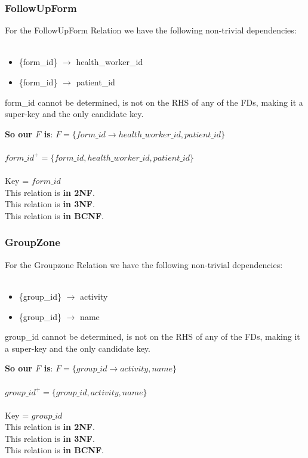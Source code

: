 \documentclass{article}
\begin{document}
\subsubsection{FollowUpForm}
For the FollowUpForm Relation we have the following non-trivial dependencies:\\
\\
\begin{minipage}{\textwidth}
\begin{itemize}
    \item  \{form\_id\}   $\rightarrow$ health\_worker\_id
    \item  \{form\_id\}   $\rightarrow$ patient\_id
\end{itemize}
\end{minipage}
form\_id cannot be determined, is not on the RHS of any of the FDs, making it a super-key and the only candidate key.
\begin{tcolorbox}
    \textbf{So our $F$ is}:
$F = \{form\_id \rightarrow health\_worker\_id, patient\_id\}$\\
\\
$form\_id^+ = \{form\_id, health\_worker\_id, patient\_id\}$\\
\\
Key = $form\_id$\\
This relation is \textbf{in 2NF}.\\
This relation is \textbf{in 3NF}.\\
This relation is \textbf{in BCNF}.
\end{tcolorbox}
\newpage
\subsubsection{GroupZone}
For the Groupzone Relation we have the following non-trivial dependencies:\\
\\
\begin{minipage}{\textwidth}
\begin{itemize}
    \item  \{group\_id\}   $\rightarrow$ activity
    \item  \{group\_id\}   $\rightarrow$ name
\end{itemize}
\end{minipage}
group\_id cannot be determined, is not on the RHS of any of the FDs, making it a super-key and the only candidate key.
\begin{tcolorbox}
    \textbf{So our $F$ is}:
$F = \{group\_id \rightarrow activity, name \}$\\
\\
$group\_id^+ = \{group\_id, activity, name\}$\\
\\
Key = $group\_id$\\
This relation is \textbf{in 2NF}.\\
This relation is \textbf{in 3NF}.\\
This relation is \textbf{in BCNF}.
\end{tcolorbox}
\end{document}
